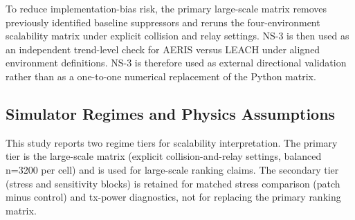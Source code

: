 ﻿\documentclass[sensors,article,submit,moreauthors,pdftex]{Definitions/mdpi}
\begin{document}
To reduce implementation-bias risk, the primary large-scale matrix removes previously identified baseline suppressors and reruns the four-environment scalability matrix under explicit collision and relay settings. NS-3 is then used as an independent trend-level check for AERIS versus LEACH under aligned environment definitions. NS-3 is therefore used as external directional validation rather than as a one-to-one numerical replacement of the Python matrix.

\subsection{Simulator Regimes and Physics Assumptions}
This study reports two regime tiers for scalability interpretation. The primary tier is the large-scale matrix (explicit collision-and-relay settings, balanced n=3200 per cell) and is used for large-scale ranking claims. The secondary tier (stress and sensitivity blocks) is retained for matched stress comparison (patch minus control) and tx-power diagnostics, not for replacing the primary ranking matrix.

\begin{table}[H]
\caption{Evidence-regime map used in this manuscript.}
\label{tab:regime_map}
\centering
{}
\end{table}
\end{document}
